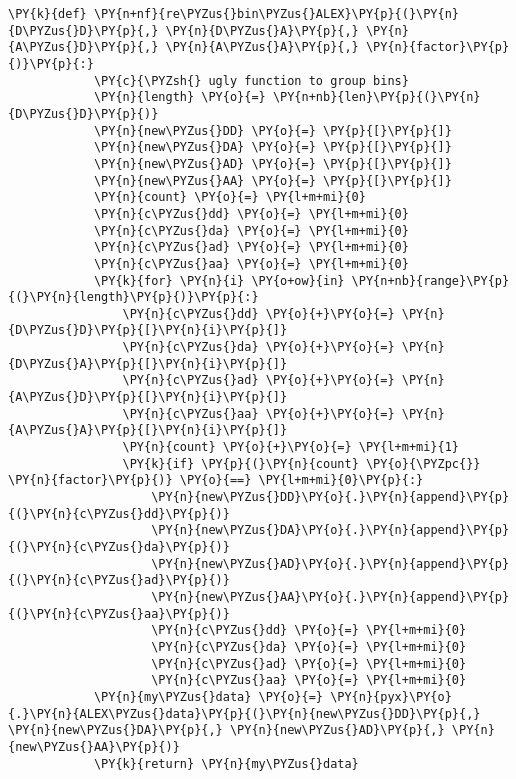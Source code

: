 \begin{Verbatim}[commandchars=\\\{\}, fontsize=\scriptsize]
        \PY{k}{def} \PY{n+nf}{re\PYZus{}bin\PYZus{}ALEX}\PY{p}{(}\PY{n}{D\PYZus{}D}\PY{p}{,} \PY{n}{D\PYZus{}A}\PY{p}{,} \PY{n}{A\PYZus{}D}\PY{p}{,} \PY{n}{A\PYZus{}A}\PY{p}{,} \PY{n}{factor}\PY{p}{)}\PY{p}{:}
            \PY{c}{\PYZsh{} ugly function to group bins}
            \PY{n}{length} \PY{o}{=} \PY{n+nb}{len}\PY{p}{(}\PY{n}{D\PYZus{}D}\PY{p}{)}
            \PY{n}{new\PYZus{}DD} \PY{o}{=} \PY{p}{[}\PY{p}{]}
            \PY{n}{new\PYZus{}DA} \PY{o}{=} \PY{p}{[}\PY{p}{]}
            \PY{n}{new\PYZus{}AD} \PY{o}{=} \PY{p}{[}\PY{p}{]}
            \PY{n}{new\PYZus{}AA} \PY{o}{=} \PY{p}{[}\PY{p}{]}
            \PY{n}{count} \PY{o}{=} \PY{l+m+mi}{0}
            \PY{n}{c\PYZus{}dd} \PY{o}{=} \PY{l+m+mi}{0}
            \PY{n}{c\PYZus{}da} \PY{o}{=} \PY{l+m+mi}{0}
            \PY{n}{c\PYZus{}ad} \PY{o}{=} \PY{l+m+mi}{0}
            \PY{n}{c\PYZus{}aa} \PY{o}{=} \PY{l+m+mi}{0}
            \PY{k}{for} \PY{n}{i} \PY{o+ow}{in} \PY{n+nb}{range}\PY{p}{(}\PY{n}{length}\PY{p}{)}\PY{p}{:}
                \PY{n}{c\PYZus{}dd} \PY{o}{+}\PY{o}{=} \PY{n}{D\PYZus{}D}\PY{p}{[}\PY{n}{i}\PY{p}{]}
                \PY{n}{c\PYZus{}da} \PY{o}{+}\PY{o}{=} \PY{n}{D\PYZus{}A}\PY{p}{[}\PY{n}{i}\PY{p}{]}
                \PY{n}{c\PYZus{}ad} \PY{o}{+}\PY{o}{=} \PY{n}{A\PYZus{}D}\PY{p}{[}\PY{n}{i}\PY{p}{]}
                \PY{n}{c\PYZus{}aa} \PY{o}{+}\PY{o}{=} \PY{n}{A\PYZus{}A}\PY{p}{[}\PY{n}{i}\PY{p}{]}
                \PY{n}{count} \PY{o}{+}\PY{o}{=} \PY{l+m+mi}{1}
                \PY{k}{if} \PY{p}{(}\PY{n}{count} \PY{o}{\PYZpc{}} \PY{n}{factor}\PY{p}{)} \PY{o}{==} \PY{l+m+mi}{0}\PY{p}{:}
                    \PY{n}{new\PYZus{}DD}\PY{o}{.}\PY{n}{append}\PY{p}{(}\PY{n}{c\PYZus{}dd}\PY{p}{)}
                    \PY{n}{new\PYZus{}DA}\PY{o}{.}\PY{n}{append}\PY{p}{(}\PY{n}{c\PYZus{}da}\PY{p}{)}
                    \PY{n}{new\PYZus{}AD}\PY{o}{.}\PY{n}{append}\PY{p}{(}\PY{n}{c\PYZus{}ad}\PY{p}{)}
                    \PY{n}{new\PYZus{}AA}\PY{o}{.}\PY{n}{append}\PY{p}{(}\PY{n}{c\PYZus{}aa}\PY{p}{)}
                    \PY{n}{c\PYZus{}dd} \PY{o}{=} \PY{l+m+mi}{0}
                    \PY{n}{c\PYZus{}da} \PY{o}{=} \PY{l+m+mi}{0}
                    \PY{n}{c\PYZus{}ad} \PY{o}{=} \PY{l+m+mi}{0}
                    \PY{n}{c\PYZus{}aa} \PY{o}{=} \PY{l+m+mi}{0}
            \PY{n}{my\PYZus{}data} \PY{o}{=} \PY{n}{pyx}\PY{o}{.}\PY{n}{ALEX\PYZus{}data}\PY{p}{(}\PY{n}{new\PYZus{}DD}\PY{p}{,} \PY{n}{new\PYZus{}DA}\PY{p}{,} \PY{n}{new\PYZus{}AD}\PY{p}{,} \PY{n}{new\PYZus{}AA}\PY{p}{)}
            \PY{k}{return} \PY{n}{my\PYZus{}data}


\end{Verbatim}
